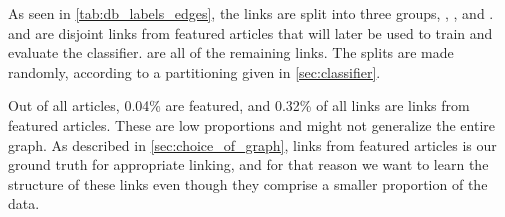 As seen in \cref{tab:db_labels_edges}, the links are split into three groups, , , and .  and  are disjoint links from featured articles that will later be used to train and evaluate the classifier.  are all of the remaining links. The splits are made randomly, according to a partitioning given in \cref{sec:classifier}.


Out of all articles, 0.04\% are featured, and 0.32\% of all links are links from featured articles. These are low proportions and might not generalize the entire graph. As described in \cref{sec:choice_of_graph}, links from featured articles is our ground truth for appropriate linking, and for that reason we want to learn the structure of these links even though they comprise a smaller proportion of the data.

